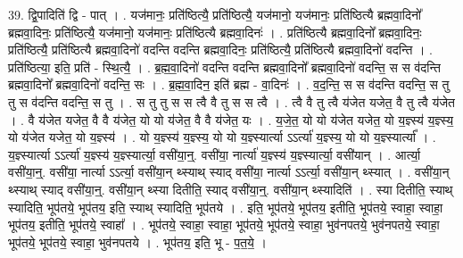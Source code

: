 \documentclass[17pt]{extarticle}
\begin{document}
39. द्वि॒पादिति॑ द्वि - पात् । . यज॑मानः॒ प्रति॑ष्ठित्यै॒ प्रति॑ष्ठित्यै॒ यज॑मानो॒ यज॑मानः॒ प्रति॑ष्ठित्यै ब्रह्मवा॒दिनो᳚ ब्रह्मवा॒दिनः॒ प्रति॑ष्ठित्यै॒ यज॑मानो॒ यज॑मानः॒ प्रति॑ष्ठित्यै ब्रह्मवा॒दिनः॑ । . प्रति॑ष्ठित्यै ब्रह्मवा॒दिनो᳚ ब्रह्मवा॒दिनः॒ प्रति॑ष्ठित्यै॒ प्रति॑ष्ठित्यै ब्रह्मवा॒दिनो॑ वदन्ति वदन्ति ब्रह्मवा॒दिनः॒ प्रति॑ष्ठित्यै॒ प्रति॑ष्ठित्यै ब्रह्मवा॒दिनो॑ वदन्ति । . प्रति॑ष्ठित्या॒ इति॒ प्रति॑ - स्थि॒त्यै॒ । . ब्र॒ह्म॒वा॒दिनो॑ वदन्ति वदन्ति ब्रह्मवा॒दिनो᳚ ब्रह्मवा॒दिनो॑ वदन्ति॒ स स व॑दन्ति ब्रह्मवा॒दिनो᳚ ब्रह्मवा॒दिनो॑ वदन्ति॒ सः । . ब्र॒ह्म॒वा॒दिन॒ इति॑ ब्रह्म - वा॒दिनः॑ । . व॒द॒न्ति॒ स स व॑दन्ति वदन्ति॒ स तु तु स व॑दन्ति वदन्ति॒ स तु । . स तु तु स स त्वै वै तु स स त्वै । . त्वै वै तु त्वै य॑जेत यजेत॒ वै तु त्वै य॑जेत । . वै य॑जेत यजेत॒ वै वै य॑जेत॒ यो यो य॑जेत॒ वै वै य॑जेत॒ यः । . य॒जे॒त॒ यो यो य॑जेत यजेत॒ यो य॒ज्ञ्स्य॑ य॒ज्ञ्स्य॒ यो य॑जेत यजेत॒ यो य॒ज्ञ्स्य॑ । . यो य॒ज्ञ्स्य॑ य॒ज्ञ्स्य॒ यो यो य॒ज्ञ्स्यार्त्या ऽऽर्त्या॑ य॒ज्ञ्स्य॒ यो यो य॒ज्ञ्स्यार्त्या᳚ । . य॒ज्ञ्स्यार्त्या ऽऽर्त्या॑ य॒ज्ञ्स्य॑ य॒ज्ञ्स्यार्त्या॒ वसी॑या॒न्॒. वसी॑या॒ नार्त्या॑ य॒ज्ञ्स्य॑ य॒ज्ञ्स्यार्त्या॒ वसी॑यान् । . आर्त्या॒ वसी॑या॒न्॒. वसी॑या॒ नार्त्या ऽऽर्त्या॒ वसी॑या॒न् थ्स्याथ् स्याद् वसी॑या॒ नार्त्या ऽऽर्त्या॒ वसी॑या॒न् थ्स्यात् । . वसी॑या॒न् थ्स्याथ् स्याद् वसी॑या॒न्॒. वसी॑या॒न् थ्स्या दितीति॒ स्याद् वसी॑या॒न्॒. वसी॑या॒न् थ्स्यादिति॑ । . स्या दितीति॒ स्याथ् स्यादिति॒ भूप॑तये॒ भूप॑तय॒ इति॒ स्याथ् स्यादिति॒ भूप॑तये । . इति॒ भूप॑तये॒ भूप॑तय॒ इतीति॒ भूप॑तये॒ स्वाहा॒ स्वाहा॒ भूप॑तय॒ इतीति॒ भूप॑तये॒ स्वाहा᳚ । . भूप॑तये॒ स्वाहा॒ स्वाहा॒ भूप॑तये॒ भूप॑तये॒ स्वाहा॒ भुव॑नपतये॒ भुव॑नपतये॒ स्वाहा॒ भूप॑तये॒ भूप॑तये॒ स्वाहा॒ भुव॑नपतये । . भूप॑तय॒ इति॒ भू - प॒त॒ये॒ । \newline
\end{document}
